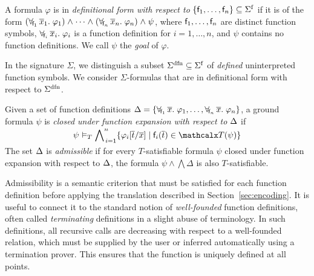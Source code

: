 \begin{definition}\rm
A formula $\varphi$ is in \emph{definitional form with respect to}
$\{ \con{f}_1, \ldots, \con{f}_n \} \subseteq \sfuns{\Sigma}$ if it is of the
form
%
%
$(\forallf{\con{f}_1} \vec x_1.\; \varphi_1) \wedge \cdots \wedge
(\forallf{\con{f}_n} \vec x_n.\; \varphi_n) \wedge \psi$,
%
where $\mathsf{f}_1, \ldots, \mathsf{f}_n$ are distinct function symbols,
$\forall_{\!\mathsf{f}_i\:} \overline{x}_i.\; \varphi_i$ is a function definition
for $i = 1, \ldots, n$,
%
and $\psi$ contains no function definitions.
We call $\psi$ the \emph{goal} of $\varphi$.
\end{definition}

In the signature $\Sigma$, we distinguish a subset $\sfundefs{\Sigma}
\subseteq \sfuns{\Sigma}$ of \emph{defined} uninterpreted function symbols.
We consider $\Sigma$-formulas that are in definitional form with respect to
$\sfundefs{\Sigma}$.

\begin{definition}\rm
Given a set of function definitions 
$\DDD = \{ \forallf{\con{f}_1} \vec x.\; \varphi_1, \ldots, \forallf{\con{f}_n} \vec x.\; \varphi_n \}$, 
a ground formula $\psi$ 
is \emph{closed under function expansion with respect to $\DDD$} if
\[\psi \models_T \smash{\bigwedge\nolimits_{\,i=1}^{n} \{ \varphi_i[ \vec t / \vec x ] \mid \con{f}_i( \vec t ) \in \terms( \psi ) \}}\]
The set $\DDD$ is \emph{admissible} if for every $T$-satisfiable formula 
$\psi$ closed under function expansion with respect to $\DDD$,
the formula
$\psi \wedge \bigwedge \Delta$ is also $T$-satisfiable.
\end{definition}

Admissibility is a semantic criterion that must be satisfied for each function
definition before applying the translation described in
Section~\ref{sec:encoding}. It is useful to connect it to the
standard notion of \emph{well-founded} function definitions, often called
\emph{terminating} definitions in a slight abuse of terminology. In such
definitions, all recursive calls are decreasing with respect to a well-founded
relation, which must be supplied by the user or inferred automatically
using a termination prover. This ensures that the function is uniquely defined
at all points.


